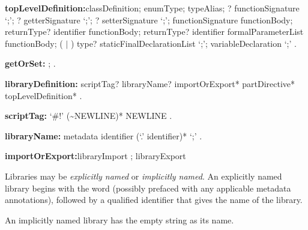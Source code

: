 \documentclass{article}
\begin{document}
 \begin{grammar}
{\bf topLevelDefinition:}classDefinition;
     enumType;
      typeAlias;
      \EXTERNAL{}? functionSignature `{\escapegrammar ;}';
      \EXTERNAL{}? getterSignature `{\escapegrammar ;}';
      \EXTERNAL{}? setterSignature `{\escapegrammar ;}';
      functionSignature functionBody;
      returnType? \GET{} identifier functionBody;
      returnType? \SET{} identifier formalParameterList functionBody;
      (\FINAL{} $|$ \CONST{}) type? staticFinalDeclarationList `{\escapegrammar ;}';
      variableDeclaration `{\escapegrammar ;}'
    .

    {\bf getOrSet:} \GET{};
      \SET{}
    .



{\bf libraryDefinition:}
      scriptTag? libraryName? importOrExport* partDirective* topLevelDefinition*
    .

    {\bf     scriptTag:}
   `\#!' {\escapegrammar (\~{}NEWLINE)*} NEWLINE
 .

{\bf libraryName:}
   metadata \LIBRARY{} identifier (`{\escapegrammar .}' identifier)* `{\escapegrammar ;}'
   .

{\bf importOrExport:}libraryImport ;
  libraryExport
 \end{grammar}

\LMHash{}
 Libraries may be {\em explicitly named} or {\em implicitly named}. An explicitly named library begins with  the  word \LIBRARY{} (possibly prefaced with any applicable metadata annotations), followed by a qualified identifier that gives the name of the library.


\LMHash{}
An implicitly named library has the empty string as its name.

\end{document}
